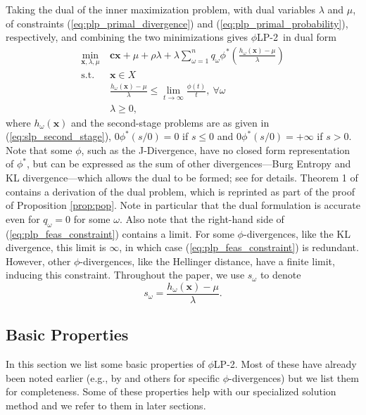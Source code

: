 \documentclass[opre,nonblindrev]{informs3} %
\newcommand{\x}{\mathbf{x}}
\renewcommand{\c}{\mathbf{c}}
\newcommand{\st}{\mbox{s.t.}}
\newcommand{\plp}{$\phi$LP-2}
\begin{document}
Taking the dual of the inner maximization problem, with dual variables $\lambda$ and $\mu$, of constraints (\ref{eq:plp_primal_divergence}) and (\ref{eq:plp_primal_probability}), respectively, and combining the two minimizations gives \plp\ in dual form
\begin{align}
	\min_{\x,\lambda,\mu} \ & \c\x + \mu + \rho \lambda + \lambda \sum_{\omega=1}^{n} q_\omega \phi^*\left(\frac{h_\omega(\x) - \mu}{\lambda}\right) \label{eq:plp_two_stage} \\
	\st \ & \x \in X \nonumber \\
	& \frac{h_\omega(\x) - \mu}{\lambda} \leq \lim_{t \rightarrow \infty} \frac{\phi(t)}{t}, \ \forall \omega \label{eq:plp_feas_constraint}\\
	& \lambda \geq 0, \nonumber
\end{align}
where $h_\omega(\x)$ and the second-stage problems are as given in (\ref{eq:slp_second_stage}), $0\phi^*(s/0)=0$ if $s\leq 0$ and  $0\phi^*(s/0)=+\infty$ if $s > 0$.
Note that some $\phi$, such as the J-Divergence, have no closed form representation of $\phi^*$, but can be expressed as the sum of other divergences---Burg Entropy and KL divergence---which allows the dual to be formed; see \citep{bental2011robust} for details.
Theorem 1 of \cite{bental2011robust} contains a derivation of the dual problem, which is reprinted as part of the proof of Proposition \ref{prop:pop}.
Note in particular that the dual formulation is accurate even for $q_\omega = 0$ for some $\omega$.
Also note that the right-hand side of (\ref{eq:plp_feas_constraint}) contains a limit.
For some $\phi$-divergences, like the KL divergence, this limit is $\infty$, in which case (\ref{eq:plp_feas_constraint}) is redundant.
However, other $\phi$-divergences, like the Hellinger distance, have a finite limit, inducing this constraint.
Throughout the paper, we use $s_\omega$ to denote
\begin{equation}
	s_\omega = \frac{h_\omega(\x) - \mu}{\lambda}. \label{eq:s_omega_definition}
\end{equation}


\subsection{Basic Properties}
\label{ssec:basicprop}

In this section we list some basic properties of \plp.
Most of these have already been noted earlier (e.g., by \cite{bental2011robust} and others for specific $\phi$-divergences) but we list them for completeness.
Some of these properties help with our specialized solution method and we refer to them in later sections.
\end{document}
